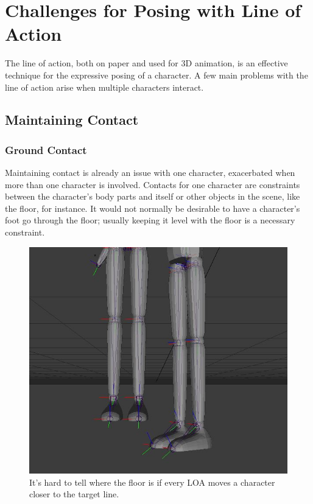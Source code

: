 \chapter{Challenges for Posing with Line of Action}\label{chap:issues}
The line of action, both on paper and used for 3D animation, is an effective technique for the expressive posing of a character. A few main problems with the line of action arise when multiple characters interact.

\section{Maintaining Contact}
\subsection{Ground Contact}
Maintaining contact is already an issue with one character, exacerbated when more than one character is involved. Contacts for one character are constraints between the character's body parts and itself or other objects in the scene, like the floor, for instance. It would not normally be desirable to have a character's foot go through the floor; usually keeping it level with the floor is a necessary constraint.

\begin{figure}[!h]
\centering
\includegraphics[scale=0.5]{img/constraint}
\caption{It's hard to tell where the floor is if every LOA moves a character closer to the target line.}
\end{figure}


